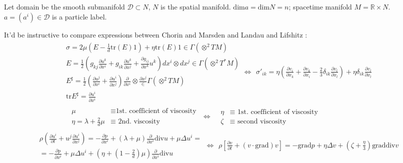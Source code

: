 \documentclass[twoside,landscape,10pt]{amsart}
\theoremstyle{plain}
\theoremstyle{definition}
\theoremstyle{remark}
\theoremstyle{remark}
\begin{document}
\begin{multicols*}{2}
Let domain be the smooth submanifold $\mathcal{D} \subset N$, $N$ is the spatial manifold. $\text{dim}a = \text{dim}N=n$; spacetime manifold $M = \mathbb{R}\times N$.  \\
\phantom{Let} $a =(a^i) \in \mathcal{D}$ is a particle label.  


It'd be instructive to compare expressions between Chorin and Marsden \cite{AChorinJMarsden2000} and Landau and Lifshitz \cite{LLandauELifshitz1987}:
\[
\begin{gathered}
  \begin{gathered}
    \sigma = 2 \mu ( E - \frac{1}{d} \text{tr}(E)1 ) + \eta \text{tr}(E) 1 \in \Gamma(\otimes^2TM) \\ 
    E = \frac{1}{2} ( g_{kj} \frac{ \partial u^k}{ \partial x^i} + g_{ik} \frac{ \partial u^k}{ \partial x^j} + \frac{ \partial g_{ij}}{ \partial x^k} u^k ) dx^i \otimes dx^j \in \Gamma(\otimes^2 T^*M) \\ 
    E^{\sharp} = \frac{1}{2} \left( \frac{ \partial u^j}{ \partial x^i} + \frac{ \partial u^i}{ \partial x^j} \right) \frac{ \partial }{ \partial x^i} \otimes \frac{ \partial x^j} \in \Gamma(\otimes^2 TM) \\
\text{tr}E^{\sharp} = \frac{ \partial u^i}{ \partial x^i}
\end{gathered} \Longleftrightarrow \begin{gathered}
    \sigma'_{ik} = \eta \left( \frac{ \partial v_i}{ \partial x_k} + \frac{ \partial v_k}{ \partial x_i} - \frac{2}{3} \delta_{ik} \frac{ \partial v_l}{ \partial x_l } \right) +\eta \delta_{ik} \frac{ \partial v_l}{ \partial x_l}
\end{gathered} \\
\begin{aligned}
&  \mu  & \equiv \text{1st. coefficient of viscosity } \\ 
&  \eta = \lambda + \frac{2}{d} \mu & \equiv \text{ 2nd. viscosity }
\end{aligned} \Longleftrightarrow \begin{aligned}
&  \eta & \equiv \text{ 1st. coefficient of viscosity }\\
& \zeta & \equiv \text{ second viscosity } \end{aligned} 
\end{gathered}
\]
\[
\begin{gathered}
\begin{gathered}
  \rho \left( \frac{ \partial u^i}{ \partial t} + u^j \frac{ \partial u^i }{ \partial x^j} \right) = - \frac{ \partial p}{ \partial x^i } + (\lambda + \mu) \frac{ \partial }{ \partial x^i} \text{div}u + \mu \Delta u^i = \\
  = - \frac{ \partial p}{ \partial x^i} + \mu \Delta u^i + \left( \eta + (1- \frac{2}{d} ) \mu \right) \frac{ \partial }{ \partial x^i} \text{div}u
\end{gathered} \Longleftrightarrow \begin{gathered}
\rho \left[ \frac{ \partial v}{ \partial t} + (v\cdot \text{grad})v \right] = -\text{grad}p + \eta \Delta v + \left(\zeta + \frac{ \eta}{3} \right)\text{grad}\text{div}v 
\end{gathered}
\end{gathered}
\]


\end{multicols*}
\end{document}
